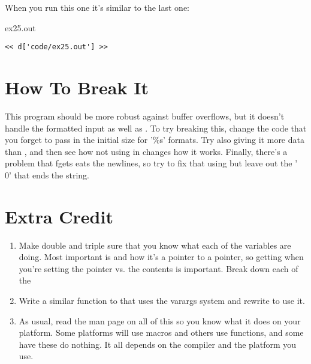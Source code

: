 When you run this one it's similar to the last one:

\begin{code}{ex25.out}
\begin{lstlisting}
<< d['code/ex25.out'] >>
\end{lstlisting}
\end{code}

\section{How To Break It}

This program should be more robust against buffer overflows, but it doesn't
handle the formatted input as well as .  To try breaking this,
change the code that you forget to pass in the initial size for '\%s' formats.
Try also giving it more data than , and then see how not
using  in  changes how it works.  Finally,
there's a problem that fgets eats the newlines, so try to fix that using
 but leave out the '\\0' that ends the string.

\section{Extra Credit}

\begin{enumerate}
\item Make double and triple sure that you know what each of the 
    variables are doing.  Most important is  and how it's
    a pointer to a pointer, so getting when you're setting the pointer vs. the
    contents is important.  Break down each of the 
\item Write a similar function to  that uses the varargs system
    and rewrite  to use it.
\item As usual, read the man page on all of this so you know what it does
    on your platform.  Some platforms will use macros and others use
    functions, and some have these do nothing.  It all depends on the 
    compiler and the platform you use.
\end{enumerate}

